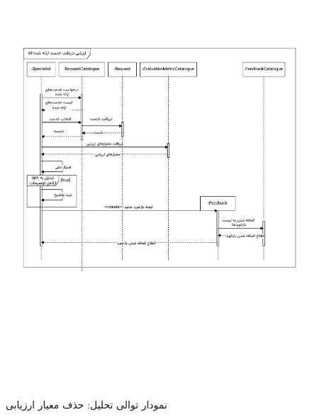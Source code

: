 \begin{figure}[ht!]
	\centering
	\includegraphics[scale=0.8, page=5]{figs/OOD-Sequence-3.pdf}
	\caption{نمودار توالی تحلیل: حذف معیار ارزیابی}
\end{figure}
\FloatBarrier
\newpage


